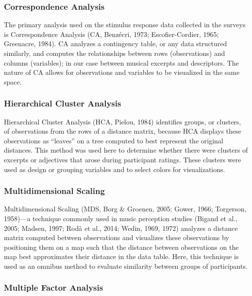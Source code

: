\documentclass[
  english,
  man]{apa6}
\begin{document}
\hypertarget{correspondence-analysis}{%
\subsubsection{Correspondence Analysis}\label{correspondence-analysis}}

The primary analysis used on the stimulus response data collected in the surveys is Correspondence Analysis (CA, Benzécri, 1973; Escofier-Cordier, 1965; Greenacre, 1984). CA analyzes a contingency table, or any data structured similarly, and computes the relationships between rows (observations) and columns (variables); in our case between musical excerpts and descriptors. The nature of CA allows for observations and variables to be visualized in the same space.

\hypertarget{hierarchical-cluster-analysis}{%
\subsubsection{Hierarchical Cluster Analysis}\label{hierarchical-cluster-analysis}}

Hierarchical Cluster Analysis (HCA, Pielou, 1984) identifies groups, or clusters, of observations from the rows of a distance matrix, because HCA displays these observations as ``leaves'' on a tree computed to best represent the original distances. This method was used here to determine whether there were clusters of excerpts or adjectives that arose during participant ratings. These clusters were used as design or grouping variables and to select colors for visualizations.

\hypertarget{multidimensional-scaling}{%
\subsubsection{Multidimensional Scaling}\label{multidimensional-scaling}}

Multidimensional Scaling (MDS, Borg \& Groenen, 2005; Gower, 1966; Torgerson, 1958)---a technique commonly used in music perception studies (Bigand et al., 2005; Madsen, 1997; Rodà et al., 2014; Wedin, 1969, 1972) analyzes a distance matrix computed between observations and visualizes these observations by positioning them on a map such that the distance between observations on the map best approximates their distance in the data table. Here, this technique is used as an omnibus method to evaluate similarity between groups of participants.

\hypertarget{multiple-factor-analysis}{%
\subsubsection{Multiple Factor Analysis}\label{multiple-factor-analysis}}
\end{document}
